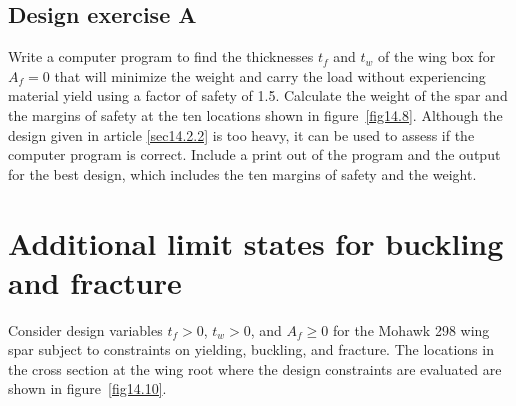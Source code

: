 \documentclass{AeroStructure-ERJohnson}
\begin{document}
\subsection{Design exercise A}\label{sec14.2.3}

Write a computer program to find the thicknesses ${t_f}$ and ${t_w}$ of the wing box for $A_{f}=0$ that will minimize the weight and carry the load without experiencing material yield using a factor of safety of 1.5. Calculate the weight of the spar and the margins of safety at the ten locations shown in figure~\ref{fig14.8}. Although the design given in article \ref{sec14.2.2} is too heavy, it can be used to assess if the computer program is correct. Include a print out of the program and the output for the best design, which includes the ten margins of safety and the weight.

{\def\thefigure{14.9}
}


\section{Additional limit states for buckling and fracture}\label{sec14.3}

Consider design variables $t_{f}>0$, $t_{w}>0$, and $A_{f} \geq 0$ for the Mohawk 298 wing spar subject to constraints on yielding, buckling, and fracture. The locations in the cross section at the wing root where the design constraints are evaluated are shown in figure~\ref{fig14.10}.

{\def\thefigure{14.10}
}
\end{document}
